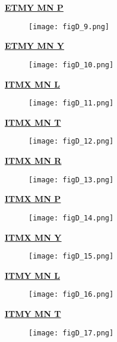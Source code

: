 \clearpage
\noindent
\underline{{\bf ETMY MN P}}
\begin{figure}[H]
\begin{center}
\texttt{[image: figD\_9.png]}
\end{center}
\end{figure}
\noindent
\underline{{\bf ETMY MN Y}}
\begin{figure}[H]
\begin{center}
\texttt{[image: figD\_10.png]}
\end{center}
\end{figure}
\noindent
\underline{{\bf ITMX MN L}}
\begin{figure}[H]
\begin{center}
\texttt{[image: figD\_11.png]}
\end{center}
\end{figure}
\clearpage
\noindent
\underline{{\bf ITMX MN T}}
\begin{figure}[H]
\begin{center}
\texttt{[image: figD\_12.png]}
\end{center}
\end{figure}
\noindent
\underline{{\bf ITMX MN R}}
\begin{figure}[H]
\begin{center}
\texttt{[image: figD\_13.png]}
\end{center}
\end{figure}
\noindent
\underline{{\bf ITMX MN P}}
\begin{figure}[H]
\begin{center}
\texttt{[image: figD\_14.png]}
\end{center}
\end{figure}
\clearpage
\noindent
\underline{{\bf ITMX MN Y}}
\begin{figure}[H]
\begin{center}
\texttt{[image: figD\_15.png]}
\end{center}
\end{figure}
\noindent
\underline{{\bf ITMY MN L}}
\begin{figure}[H]
\begin{center}
\texttt{[image: figD\_16.png]}
\end{center}
\end{figure}
\noindent
\underline{{\bf ITMY MN T}}
\begin{figure}[H]
\begin{center}
\texttt{[image: figD\_17.png]}
\end{center}
\end{figure}
